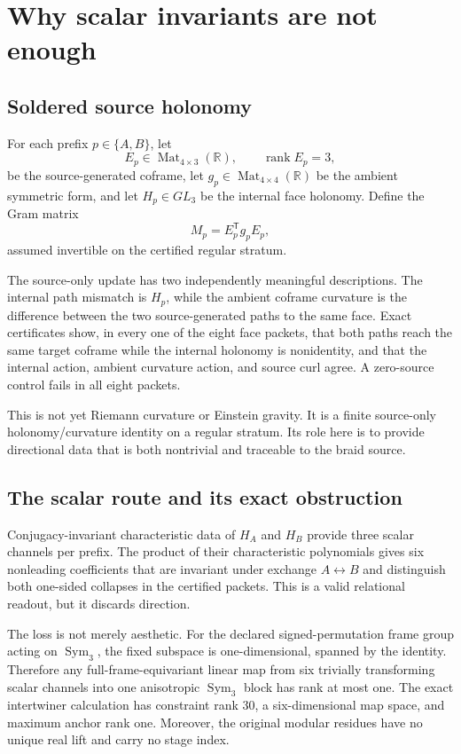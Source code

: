 \documentclass[11pt]{article}
\theoremstyle{definition}
\theoremstyle{remark}
\newcommand{\Sym}{\operatorname{Sym}}
\newcommand{\rank}{\operatorname{rank}}
\begin{document}
\section{Why scalar invariants are not enough}

\subsection{Soldered source holonomy}

For each prefix $p\in\{A,B\}$, let
\[
 E_p\in\operatorname{Mat}_{4\times3}(\mathbb R),\qquad
 \rank E_p=3,
\]
be the source-generated coframe, let $g_p\in\operatorname{Mat}_{4\times4}(\mathbb R)$ be the ambient symmetric form, and let $H_p\in GL_3$ be the internal face holonomy. Define the Gram matrix
\begin{equation}\label{eq:gram}
 M_p=E_p^{\mathsf T}g_pE_p,
\end{equation}
assumed invertible on the certified regular stratum.

The source-only update has two independently meaningful descriptions. The internal path mismatch is $H_p$, while the ambient coframe curvature is the difference between the two source-generated paths to the same face. Exact certificates show, in every one of the eight face packets, that both paths reach the same target coframe while the internal holonomy is nonidentity, and that the internal action, ambient curvature action, and source curl agree. A zero-source control fails in all eight packets.

This is not yet Riemann curvature or Einstein gravity. It is a finite source-only holonomy/curvature identity on a regular stratum. Its role here is to provide directional data that is both nontrivial and traceable to the braid source.

\subsection{The scalar route and its exact obstruction}

Conjugacy-invariant characteristic data of $H_A$ and $H_B$ provide three scalar channels per prefix. The product of their characteristic polynomials gives six nonleading coefficients that are invariant under exchange $A\leftrightarrow B$ and distinguish both one-sided collapses in the certified packets. This is a valid relational readout, but it discards direction.

The loss is not merely aesthetic. For the declared signed-permutation frame group acting on $\Sym_3$, the fixed subspace is one-dimensional, spanned by the identity. Therefore any full-frame-equivariant linear map from six trivially transforming scalar channels into one anisotropic $\Sym_3$ block has rank at most one. The exact intertwiner calculation has constraint rank 30, a six-dimensional map space, and maximum anchor rank one. Moreover, the original modular residues have no unique real lift and carry no stage index.
\end{document}
